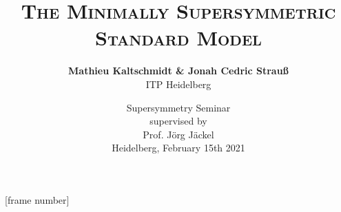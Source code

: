 
\title{\LARGE\textsc{The Minimally Supersymmetric Standard Model}}
\author{\textbf{\large Mathieu Kaltschmidt \& Jonah Cedric Strau\ss} \\[0.5em]ITP Heidelberg}
\date{Supersymmetry Seminar\\
supervised by \\ Prof. J\"org J\"ackel \\[1em]
Heidelberg, February 15th 2021}




\beamertemplatenavigationsymbolsempty
{}



\usepackage{fontspec}


[frame number]

\usepackage{amsmath}
\usepackage{amssymb}

\usepackage{polyglossia}
\setmainlanguage{english}


\usepackage{appendixnumberbeamer}
\usepackage{booktabs}
\usepackage{siunitx}
\usepackage{graphicx}
\usepackage{float}
\usepackage{blindtext}
\usepackage{physics}
\usepackage[labelfont=bf]{caption}

\usepackage{xcolor}

\usepackage{xfrac}

\usepackage[
	bibstyle=numeric-comp,
	backend=biber,
	isbn=false,
	date=year,
	url=false,
	doi=false,
	hyperref = auto, 
	maxnames=99,
	backref, 
	backrefstyle=none]{biblatex}


